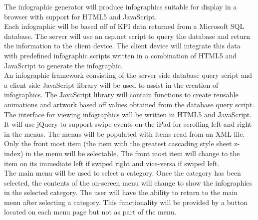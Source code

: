 \documentclass[11pt,a4paper,oneside]{article}
\begin{document}
The infographic generator will produce infographics suitable for display in a browser with support for HTML5 and JavaScript.\\


Each infographic will be based off of KPI data returned from a Microsoft SQL database.  The server will use an asp.net script to query the database and return the information to the client device.  The client device will integrate this data with predefined infographic scripts written in a combination of HTML5 and JavaScript to generate the infographic.\\


An infographic framework consisting of the server side database query script and a client side JavaScript library will be used to assist in the creation of infographics.  The JavaScript library will contain functions to create reusable animations and artwork based off values obtained from the database query script.\\


The interface for viewing infographics will be written in HTML5 and JavaScript.  It will use jQuery to support swipe events on the iPad for scrolling left and right in the menus.  The menus will be populated with items read from an XML file.  Only the front most item (the item with the greatest cascading style sheet z-index) in the menu will be selectable.  The front most item will change to the item on its immediate left if swiped right and vice-versa if swiped left.\\


The main menu will be used to select a category.  Once the category has been selected, the contents of the on-screen menu will change to show the infographics in the selected category.  The user will have the ability to return to the main menu after selecting a category.  This functionality will be provided by a button located on each menu page but not as part of the menu.\\
\end{document}
